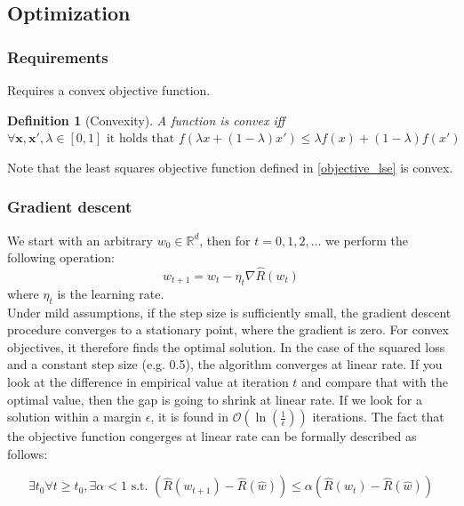 \documentclass[a4paper,10pt,twoside]{article}
\newtheorem{definition}{Definition}[section]
\begin{document}
\subsection{Optimization}
\subsubsection{Requirements}
Requires a convex objective function.
\begin{definition}[Convexity]
    A function is convex iff $\forall \mathbf{x},\mathbf{x}', \lambda\in[0,1] \text{ it holds that } f(\lambda x+(1-\lambda)x')\leq \lambda f(x)+(1-\lambda)f(x')$
\end{definition}
Note that the least squares objective function defined in \ref{objective_lse} is convex. 
\subsubsection{Gradient descent}
We start with an arbitrary $w_0\in\mathbb{R}^d$, then for $t=0,1,2,\ldots$ we perform the following operation:
\begin{equation*}
    w_{t+1} = w_t -\eta_t\nabla\hat{R}(w_t)
\end{equation*}
where $\eta_t$ is the learning rate.\\
Under mild assumptions, if the step size is sufficiently small, the gradient descent procedure converges to a stationary point, where the gradient is zero. For convex objectives, it therefore finds the optimal solution. In the case of the squared loss and a constant step size (e.g. 0.5), the algorithm converges at linear rate. If you look at the difference in empirical value at iteration $t$ and compare that with the optimal value, then the gap is going to shrink at linear rate. If we look for a solution within a margin $\epsilon$, it is found in $\mathcal{O}(\ln(\frac{1}{\epsilon}))$ iterations.  The fact that the objective function congerges at linear rate can be formally described 
as follows:

\begin{equation*}
    \exists t_0 \forall t\geq t_0, \exists \alpha<1 \text{ s.t. } (\hat{R}(w_{t+1})-\hat{R}(\hat{w}))\leq\alpha(\hat{R}(w_{t})-\hat{R}(\hat{w}))
\end{equation*}
\end{document}
